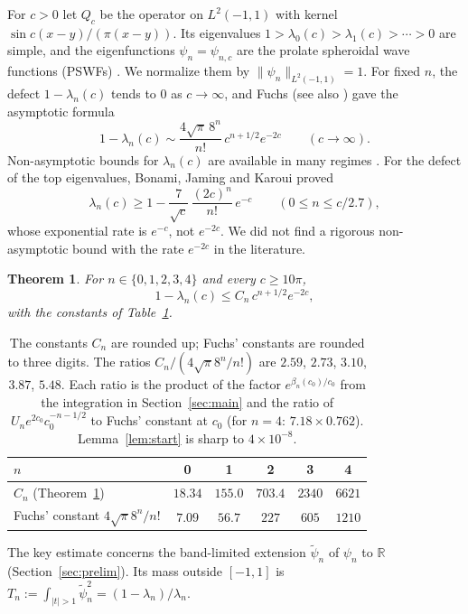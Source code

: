 \documentclass[11pt]{amsart}
\newtheorem{theorem}{Theorem}
\theoremstyle{remark}
\numberwithin{equation}{section}
\newcommand{\R}{\mathbb{R}}
\begin{document}
For $c>0$ let $Q_c$ be the operator on $L^2(-1,1)$ with kernel $\sin c(x-y)/(\pi(x-y))$. Its eigenvalues $1>\lambda_0(c)>\lambda_1(c)>\cdots>0$ are simple, and the eigenfunctions $\psi_n=\psi_{n,c}$ are the prolate spheroidal wave functions (PSWFs) \cite{SlepianPollak61,LandauPollak61}. We normalize them by $\|\psi_n\|_{L^2(-1,1)}=1$. For fixed $n$, the defect $1-\lambda_n(c)$ tends to $0$ as $c\to\infty$, and Fuchs \cite{Fuchs64} (see also \cite{Slepian65}) gave the asymptotic formula
\begin{equation}\label{eq:fuchs}
1-\lambda_n(c)\sim\frac{4\sqrt\pi\,8^n}{n!}\,c^{n+1/2}e^{-2c}\qquad(c\to\infty).
\end{equation}
Non-asymptotic bounds for $\lambda_n(c)$ are available in many regimes \cite{Osipov13a,Osipov13b,BonamiKaroui16,BonamiKaroui17,BJK21}. For the defect of the top eigenvalues, Bonami, Jaming and Karoui \cite[Thm.~3.2]{BJK21} proved
\[
\lambda_n(c)\ge1-\frac{7}{\sqrt c}\,\frac{(2c)^n}{n!}\,e^{-c}\qquad(0\le n\le c/2.7),
\]
whose exponential rate is $e^{-c}$, not $e^{-2c}$. We did not find a rigorous non-asymptotic bound with the rate $e^{-2c}$ in the literature.

\begin{theorem}\label{thm:main}
For $n\in\{0,1,2,3,4\}$ and every $c\ge10\pi$,
\[
1-\lambda_n(c)\le C_n\,c^{n+1/2}e^{-2c},
\]
with the constants of Table~\ref{tab:Cn}.
\end{theorem}

\begin{table}[h]
\centering
\begin{tabular}{lccccc}
\toprule
$n$ & 0 & 1 & 2 & 3 & 4\\
\midrule
$C_n$ (Theorem~\ref{thm:main}) & $18.34$ & $155.0$ & $703.4$ & $2340$ & $6621$\\
Fuchs' constant $4\sqrt\pi8^n/n!$ & $7.09$ & $56.7$ & $227$ & $605$ & $1210$\\
\bottomrule
\end{tabular}
\caption{The constants $C_n$ are rounded up; Fuchs' constants are rounded to three digits. The ratios $C_n/(4\sqrt\pi8^n/n!)$ are $2.59$, $2.73$, $3.10$, $3.87$, $5.48$. Each ratio is the product of the factor $e^{\beta_n(c_0)/c_0}$ from the integration in Section~\ref{sec:main} and the ratio of $U_ne^{2c_0}c_0^{-n-1/2}$ to Fuchs' constant at $c_0$ (for $n=4$: $7.18\times0.762$). Lemma~\ref{lem:start} is sharp to $4\times10^{-8}$.}\label{tab:Cn}
\end{table}

The key estimate concerns the band-limited extension $\tilde\psi_n$ of $\psi_n$ to $\R$ (Section~\ref{sec:prelim}). Its mass outside $[-1,1]$ is $T_n:=\int_{|t|>1}\tilde\psi_n^2=(1-\lambda_n)/\lambda_n$.
\end{document}
